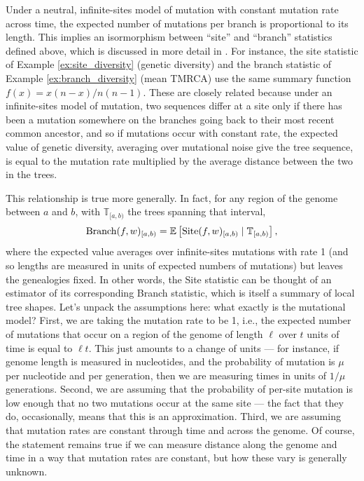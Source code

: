 \documentclass{article}
\newcommand{\branch}{\mbox{Branch}} %
\newcommand{\site}{\mbox{Site}} %
\newcommand{\given}{\;\vert\;}
\newcommand{\treeseq}{\mathbb{T}} %
\newcommand{\iw}{w} %
\begin{document}
Under a neutral, infinite-sites model of mutation with constant mutation rate across time,
the expected number of mutations per branch is proportional to its length.
This implies an isormorphism between ``site'' and ``branch'' statistics defined above,
which is discussed in more detail in \citet{ralph2019empirical}.
For instance, the site statistic of Example \ref{ex:site_diversity} (genetic diversity)
and the branch statistic of Example \ref{ex:branch_diversity} (mean TMRCA)
use the same summary function $f(x) = x(n-x)/n(n-1)$.
These are closely related because under an infinite-sites model of mutation,
two sequences differ at a site only if there has been a mutation somewhere on the branches going back
to their most recent common ancestor,
and so if mutations occur with constant rate,
the expected value of genetic diversity,
averaging over mutational noise give the tree sequence,
is equal to the mutation rate multiplied by the average distance between the two in the trees.

This relationship is true more generally.
In fact, for any region of the genome between $a$ and $b$,
with $\treeseq_{[a,b)}$ the trees spanning that interval,
\begin{align}
    \branch(f, \iw)_{[a,b)}
    =
    \E\left[ \site(f, \iw)_{[a,b)} \given \treeseq_{[a,b)} \right] ,
\end{align}
where the expected value averages over infinite-sites mutations with rate 1
(and so lengths are measured in units of expected numbers of mutations)
but leaves the genealogies fixed.
In other words, the Site statistic can be thought of an estimator of its corresponding Branch statistic,
which is itself a summary of local tree shapes.
Let's unpack the assumptions here: what exactly is the mutational model?
First, we are taking the mutation rate to be 1, i.e.,
the expected number of mutations that occur on a region of the genome of length $\ell$
over $t$ units of time is equal to $\ell t$.
This just amounts to a change of units ---
for instance, if genome length is measured in nucleotides,
and the probability of mutation is $\mu$ per nucleotide and per generation,
then we are measuring times in units of $1/\mu$ generations.
Second, we are assuming that the probability of per-site mutation is low enough
that no two mutations occur at the same site
--- the fact that they do, occasionally, means that this is an approximation.
Third, we are assuming that mutation rates are constant through time and across the genome.
Of course, the statement remains true if we can measure distance along the genome and time
in a way that mutation rates are constant, but how these vary is generally unknown.
\end{document}
